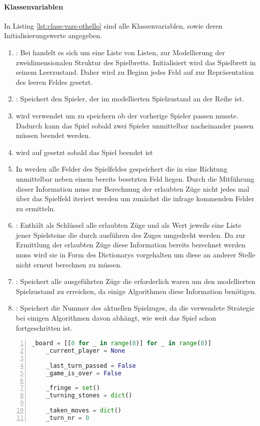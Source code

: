 \paragraph{Klassenvariablen}
In Listing \ref{lst:class-vars-othello} sind alle Klassenvariablen, sowie deren Initialisierungswerte angegeben.
\begin{enumerate}
\item {}: Bei  handelt es sich um eine Liste von Listen, zur Modellierung der zweidimensionalen Struktur des Spielbretts. Initialisiert wird das Spielbrett in seinem Leerzustand. Daher wird zu Beginn jedes Feld auf  zur Repräsentation des leeren Feldes gesetzt.
\item {}: Speichert den Spieler, der im modellierten Spielzustand an der Reihe ist.
\item {} wird verwendet um zu speichern ob der vorherige Spieler  passen musste. Dadurch kann das Spiel sobald zwei Spieler unmittelbar nacheinander passen müssen beendet werden.
\item {} wird auf  gesetzt sobald das Spiel beendet ist
\item {} In  werden alle Felder des Spielfeldes gespeichert die in eine Richtung unmittelbar neben einem bereits besetzten Feld liegen. Durch die Mitführung dieser Information muss zur Berechnung der erlaubten Züge nicht jedes mal über das Spielfeld iteriert werden um zunächst die infrage kommenden Felder zu ermitteln.
\item {}: Enthält als Schlüssel alle erlaubten Züge und als Wert jeweils eine Liste jener Spielsteine die durch ausführen des Zuges umgedreht werden. Da zur Ermittlung der erlaubten Züge diese Information bereits berechnet werden muss wird sie in Form des Dictionarys vorgehalten um diese an anderer Stelle nicht erneut berechnen zu müssen.
\item {}: Speichert alle ausgeführten Züge die erforderlich waren um den modellierten Spielzustand zu erreichen, da einige Algorithmen diese Information benötigen.
\item {}: Speichert die Nummer des aktuellen Spielzuges, da die verwendete Strategie bei einigen Algorithmen davon abhängt, wie weit das Spiel schon fortgeschritten ist.
\end{enumerate}
\begin{lstlisting}[caption = {Klassenvariablen der Klasse \mxZitat{Othello}}, language = python, captionpos = t , numbers=left, label={lst:class-vars-othello}]
    _board = [[0 for _ in range(8)] for _ in range(8)]
    _current_player = None
 
    _last_turn_passed = False
    _game_is_over = False

    _fringe = set()
    _turning_stones = dict()
    
    _taken_moves = dict()
    _turn_nr = 0
\end{lstlisting}

